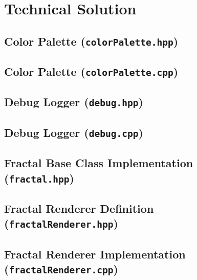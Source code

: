 \section{Technical Solution}

\subsection{Color Palette (\texttt{colorPalette.hpp})}


\subsection{Color Palette (\texttt{colorPalette.cpp})}



\pagebreak

\subsection{Debug Logger (\texttt{debug.hpp})}


\subsection{Debug Logger (\texttt{debug.cpp})}



\pagebreak

\subsection{Fractal Base Class Implementation (\texttt{fractal.hpp})}



\pagebreak

\subsection{Fractal Renderer Definition (\texttt{fractalRenderer.hpp})}


\subsection{Fractal Renderer Implementation (\texttt{fractalRenderer.cpp})}



